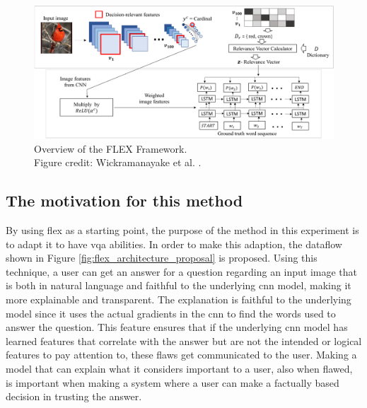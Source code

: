         \begin{figure}[htb]
            \centering
            \centerline{
            \includegraphics[width=17cm]{images/FLEX_overview.png}}
            \caption[Overview of the FLEX Framework.]{Overview of the FLEX Framework.\\
            Figure credit: Wickramanayake et al. \cite{wickramanayakeFLEXFaithfulLinguistic2019}.}
            \label{fig:flex_overview}
        \end{figure}

        \subsection{The motivation for this method}

        By using \gls{flex} as a starting point, the purpose of the method in this experiment is to adapt it to have \gls{vqa} abilities. In order to make this adaption, the dataflow shown in Figure \ref{fig:flex_architecture_proposal} is proposed. Using this technique, a user can get an answer for a question regarding an input image that is both in natural language and faithful to the underlying \gls{cnn} model, making it more explainable and transparent. The explanation is faithful to the underlying model since it uses the actual gradients in the \gls{cnn} to find the words used to answer the question. 
        This feature ensures that if the underlying \gls{cnn} model has learned features that correlate with the answer but are not the intended or logical features to pay attention to, these flaws get communicated to the user. Making a model that can explain what it considers important to a user, also when flawed, is important when making a system where a user can make a factually based decision in trusting the answer.
        

